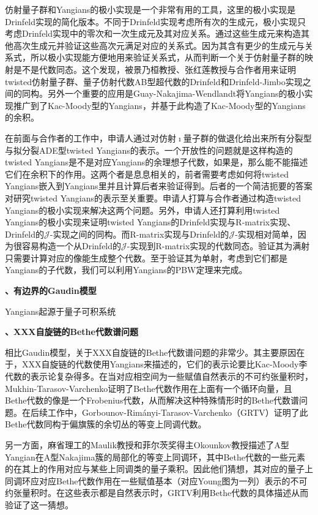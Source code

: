 \documentclass[12pt,UTF8,AutoFakeBold=4,a4paper]{ctexart}
\begin{document}
仿射量子群和Yangians的极小实现是一个非常有用的工具，这里的极小实现是Drinfeld实现的简化版本。不同于Drinfeld实现考虑所有次的生成元，极小实现只考虑Drinfeld实现中的零次和一次生成元及其对应关系。通过这些生成元来构造其他高次生成元并验证这些高次元满足对应的关系式。因为其含有更少的生成元与关系式，所以极小实现能方便地用来验证关系式，从而判断一个关于仿射量子群的映射是不是代数同态。这个发现，被景乃桓教授、张红莲教授与合作者用来证明twisted仿射量子群、量子仿射代数AB型超代数的Drinfeld和Drinfeld-Jimbo实现之间的同构。另外一个重要的应用是Guay-Nakajima-Wendlandt将Yangians的极小实现推广到了Kac-Moody型的Yangians，并基于此构造了Kac-Moody型的Yangians的余积。

在前面与合作者的工作中，申请人通过对仿射$\imath$量子群的做退化给出来所有分裂型与拟分裂ADE型twisted Yangians的表示。一个开放性的问题就是这样构造的twisted Yangians是不是对应Yangians的余理想子代数，如果是，那么能不能描述它们在余积下的作用。这两个者是息息相关的，前者需要考虑如何将twisted Yangians嵌入到Yangians里并且计算后者来验证得到。后者的一个简洁扼要的答案对研究twisted Yangians的表示至关重要。申请人打算与合作者通过构造twisted Yangians的极小实现来解决这两个问题。另外，申请人还打算利用twisted Yangians的极小实现来证明twisted Yangians的Drinfeld实现与R-matrix实现、Drinfeld的$\mathcal J$-实现之间的同构。而R-matrix实现与Drinfeld的$\mathcal J$-实现相对简单，因为很容易构造一个从Drinfeld的$\mathcal J$-实现到R-matrix实现的代数同态。验证其为满射只需要计算对应的像能生成整个代数。至于验证其为单射，考虑到它们都是Yangians的子代数，我们可以利用Yangians的PBW定理来完成。

\medskip

\textbf{、有边界的Gaudin模型}

Yangians起源于量子可积系统


\medskip

\textbf{、XXX自旋链的Bethe代数谱问题}

相比Gaudin模型，关于XXX自旋链的Bethe代数谱问题的非常少。其主要原因在于，XXX自旋链的代数使用Yangians来描述的，它们的表示论要比Kac-Moody李代数的表示论复杂得多。在当对应相空间为一些赋值自然表示的不可约张量积时，Mukhin-Tarasov-Varchenko证明了Bethe代数作用在上面有一个循环向量，且Bethe代数的像是一个Frobenius代数，从而解决这种特殊情形时的Bethe代数谱问题。在后续工作中，Gorbounov-Rimányi-Tarasov-Varchenko（GRTV）证明了此Bethe代数同构于偏旗簇的余切丛的等变上同调代数。

另一方面，麻省理工的Maulik教授和菲尔茨奖得主Okounkov教授描述了A型Yangian在A型Nakajima簇的局部化的等变上同调环，其中Bethe代数的一些元素的在其上的作用对应与某些上同调类的量子乘积。因此他们猜想，其对应的量子上同调环应对应Bethe代数作用在一些赋值基本（对应Young图为一列）表示的不可约张量积时。在这些表示都是自然表示时，GRTV利用Bethe代数的具体描述从而验证了这一猜想。
\end{document}
